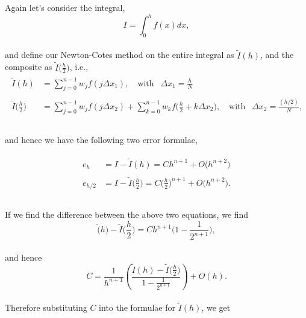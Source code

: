 \documentclass[paper=a4, fontsize=11pt]{scrartcl} %
\numberwithin{equation}{section} %
\numberwithin{figure}{section} %
\numberwithin{table}{section} %
\begin{document}
Again let's consider the integral,\\ $$I=\int_0^h f(x) dx,$$ \\ 

and define our Newton-Cotes method on the entire integral as $\tilde{I}(h)$, and the composite as $\tilde{I}\big(\frac{h}{2}\big)$, i.e.,\\

\begin{align}
\nonumber
\begin{split}
 \tilde{I}(h) &= \sum_{j=0}^{n-1} w_j f(j\Delta x_1), \ \ \ \mbox{ with } \ \ \Delta x_1 = \frac{h}{N} \\ \\
 \tilde{I}\bigg(\frac{h}{2}\bigg) &= \sum_{j=0}^{n-1} w_j f(j\Delta x_2) + \sum_{k=0}^{n-1} w_k f\bigg(\frac{h}{2}+ k\Delta x_2\bigg), \ \ \ \mbox{ with } \ \ \Delta x_2 = \frac{(h/2)}{N}, \\ \\
 \end{split}
 \end{align}
 
 and hence we have the following two error formulae,
 
 \begin{align}
\nonumber
\begin{split}
e_h &= I - \tilde{I}(h) = Ch^{n+1} + O\big(h^{n+2}\big)  \\ \\
e_{h/2} &= I - \tilde{I}\bigg(\frac{h}{2}\bigg) = C\bigg(\frac{h}{2}\bigg)^{n+1}+ O\big(h^{n+2}\big).  \\ \\
 \end{split}
 \end{align}
 
 If we find the difference between the above two equations, we find\\
 
 $$\tilde(h) - \tilde{I}\bigg(\frac{h}{2}\bigg) = C h^{n+1} \bigg(1-\frac{1}{2^{n+1}}\bigg),$$\\
 
 and hence \\
 
 $$C = \frac{1}{h^{n+1}} \left( \frac{\tilde{I}(h) - \tilde{I}\bigg(\frac{h}{2}\bigg) }{1-\frac{1}{2^{n+1}}}\right) + O(h).$$\\
 
 Therefore substituting $C$ into the formulae for $\tilde{I}(h)$, we get\\
 
\end{document}
